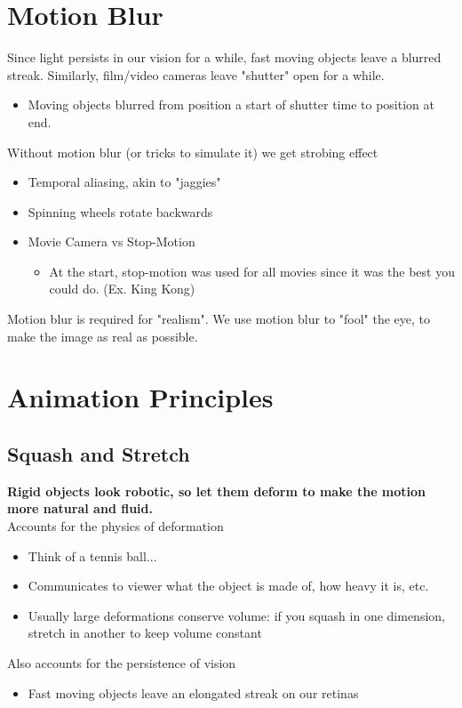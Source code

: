 \documentclass{article}
\begin{document}
\section*{Motion Blur}
Since light persists in our vision for a while, fast moving objects leave a blurred streak.  Similarly, film/video cameras leave "shutter" open for a while.
\begin{itemize}
    \item Moving objects blurred from position a start of shutter time to position at end.
\end{itemize}
Without motion blur (or tricks to simulate it) we get strobing effect
\begin{itemize}
    \item Temporal aliasing, akin to "jaggies"
    \item Spinning wheels rotate backwards
    \item Movie Camera vs Stop-Motion
    \begin{itemize}
        \item At the start, stop-motion was used for all movies since it was the best you could do.  (Ex. King Kong)
    \end{itemize}
\end{itemize}
Motion blur is required for "realism".  We use motion blur to "fool" the eye, to make the image as real as possible.

\section*{Animation Principles}
\subsection*{Squash and Stretch}
\textbf{Rigid objects look robotic, so let them deform to make the motion more natural and fluid.}\\
Accounts for the physics of deformation
\begin{itemize}
    \item Think of a tennis ball...
    \item Communicates to viewer what the object is made of, how heavy it is, etc.
    \item Usually large deformations conserve volume: if you squash in one dimension, stretch in another to keep volume constant
\end{itemize}
Also accounts for the persistence of vision
\begin{itemize}
    \item Fast moving objects leave an elongated streak on our retinas
\end{itemize}
\end{document}
